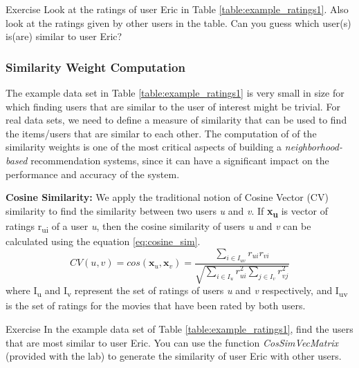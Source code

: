 \begin{myremark}{Exercise }
Look at the ratings of user Eric in Table \ref{table:example_ratings1}. Also look at the ratings given by other users in the table. Can you guess which user(s) is(are) similar to user Eric?
\end{myremark}

\subsubsection{Similarity Weight Computation}
The example data set in Table \ref{table:example_ratings1} is very small in size for which finding users that are similar to the user of interest might be trivial. For real data sets, we need to define a measure of similarity that can be used to find the items/users that are similar to each other. The computation of of the similarity weights is one of the most critical aspects of building a \textit{neighborhood-based} recommendation systems, since it can have a significant impact on the performance and accuracy of the system.

\textbf{Cosine Similarity:} We apply the traditional notion of Cosine Vector (CV) similarity to find the similarity between two users \textit{u} and \textit{v}. If \textbf{x\textsubscript{u}} is vector of ratings r\textsubscript{ui} of a user \textit{u}, then the cosine similarity of users \textit{u} and \textit{v} can be calculated using the equation \ref{eq:cosine_sim}.
 \begin{equation} \label{eq:cosine_sim}
CV(u,v) = cos(\textbf{x}_{u}, \textbf{x}_{v}) = \frac
{\sum_{i \in{I_{uv}}}^{}{r_{ui}r_{vi}}}
{\sqrt	{	\sum_{i \in{I_{u}}}^{}{r_{ui}^2}	\sum_{j \in{I_{v}}}^{}{r_{vj}^2}}		}
\end{equation}
where I\textsubscript{u} and I\textsubscript{v} represent the set of ratings of users \textit{u} and \textit{v} respectively, and I\textsubscript{uv} is the set of ratings for the movies that have been rated by both users.

\begin{myremark}{Exercise }
In the example data set of Table \ref{table:example_ratings1}, find the users that are most similar to user Eric. You can use the function \textit{CosSimVecMatrix} (provided with the lab) to generate the similarity of user Eric with other users.
\end{myremark}

